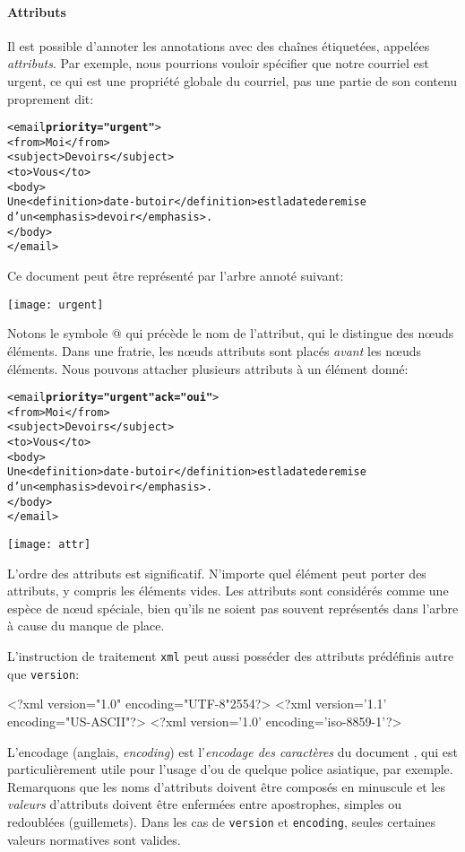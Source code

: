\paragraph{Attributs}

Il est possible d'annoter les annotations avec des chaînes
étiquetées, appelées \emph{attributs}. Par exemple, nous pourrions
vouloir spécifier que notre courriel est urgent, ce qui est une
propriété globale du courriel, pas une partie de son contenu
proprement dit:
\begin{alltt}
\small<email \textbf{priority="urgent"}>
  <from>Moi</from>
  <subject>Devoirs</subject>
  <to>Vous</to>
  <body>
  Une <definition>date-butoir</definition> est la date de remise
d'un <emphasis>devoir</emphasis>.
  </body>
</email>
\end{alltt}
Ce document \XML peut être représenté par l'arbre annoté suivant:
\begin{center}
\texttt{[image: urgent]}
\end{center}
Notons le symbole \textsf{@} qui précède le nom de l'attribut, qui le
distingue des n{\oe}uds éléments. Dans une fratrie, les n{\oe}uds
attributs sont placés \emph{avant}\label{attr_before} les n{\oe}uds
éléments. Nous pouvons attacher plusieurs attributs à un élément
donné:
\begin{alltt}
\small<email \textbf{priority="urgent"} \textbf{ack="oui"}>
  <from>Moi</from>
  <subject>Devoirs</subject>
  <to>Vous</to>
  <body>
  Une <definition>date-butoir</definition> est la date de remise
d'un <emphasis>devoir</emphasis>.
  </body>
</email>
\end{alltt}
\begin{center}
\texttt{[image: attr]}
\end{center}
L'ordre des attributs est significatif. N'importe quel élément peut
porter des attributs, y compris les éléments vides. Les attributs sont
considérés comme une espèce de n{\oe}ud spéciale, bien qu'ils ne
soient pas souvent représentés dans l'arbre \XML à cause du manque de
place.

L'instruction de traitement \texttt{xml} peut aussi posséder des
attributs prédéfinis autre que \verb|version|:
\begin{sverb}
<?xml version="1.0" encoding="UTF-8"2554?>
<?xml version='1.1' encoding="US-ASCII"?>
<?xml version='1.0' encoding='iso-8859-1'?>
\end{sverb}
L'encodage (anglais, \emph{encoding}) est l'\emph{encodage
  des caractères} du document \XML, qui est particulièrement utile
pour l'usage d'\Unicode ou de quelque police asiatique, par
exemple. Remarquons que les noms d'attributs doivent être composés en
minuscule et les \emph{valeurs} d'attributs doivent être enfermées
entre apostrophes, simples ou redoublées (guillemets). Dans les cas de
\verb|version| et \verb|encoding|, seules certaines valeurs normatives
sont valides.


